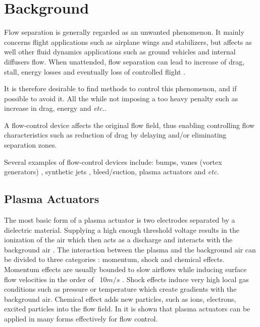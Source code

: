 \documentclass[10pt,a4paper]{article}
\begin{document}


\section{Background}
Flow separation is generally regarded as an unwanted phenomenon. It mainly concerns flight applications such as airplane wings and stabilizers, but affects as well other fluid dynamics applications such as ground vehicles and internal diffusers flow. When unattended, flow separation can lead to increase of drag, stall, energy losses and eventually loss of controlled flight \cite{SIMPSON}.
\par It is therefore desirable to find methods to control this phenomenon, and if possible to avoid it. All the while not imposing a too heavy penalty such as increase in drag, energy and \textit{etc.}.  
\par A flow-control device affects the original flow field, thus enabling controlling flow characteristics such as reduction of drag by delaying and/or eliminating separation zones. \par Several examples of flow-control devices include: bumps, vanes (vortex generators) \cite{LIN}, synthetic jets \cite{GLEZER}, bleed/suction, plasma actuators \cite{MOREAU,CORKE} and \textit{etc}.
\subsection{Plasma Actuators}
The most basic form of a plasma actuator is two electrodes  separated by a dielectric material. Supplying a high enough threshold voltage results in the ionization of the air which then acts as a discharge and interacts with the background air \cite{CORKE}.
The interaction between the plasma and the background air can be divided to three categories \cite{FLOWCTRL}: momentum, shock and chemical effects. Momentum effects are usually bounded to slow airflows while inducing surface flow velocities in the order of ~10$m/s$ \cite{FLOWCTRL,KOK,WHALLEY}. Shock effects induce very high local gas conditions such as pressure or temperature which create gradients with the background air. Chemical effect adds new particles, such as ions, electrons, excited particles into the flow field. In \cite{GLEZER,MOREAU,CORKE,FLOWCTRL,KOK,WHALLEY} it is shown that plasma actuators can be applied in many forms effectively for flow control. 
\end{document}
